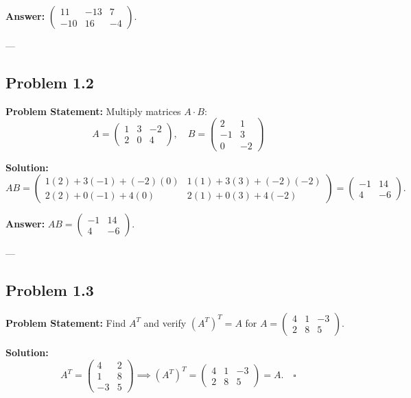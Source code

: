 \documentclass[11pt, a4paper]{article}
\begin{document}
\textbf{Answer:} $\begin{pmatrix} 11 & -13 & 7 \\ -10 & 16 & -4 \end{pmatrix}$.

---

\subsection*{Problem 1.2}
\textbf{Problem Statement:} Multiply matrices $A \cdot B$:
$$ A = \begin{pmatrix} 1 & 3 & -2 \\ 2 & 0 & 4 \end{pmatrix}, \quad B = \begin{pmatrix} 2 & 1 \\ -1 & 3 \\ 0 & -2 \end{pmatrix} $$

\textbf{Solution:}
$$ AB = \begin{pmatrix} 1(2)+3(-1)+(-2)(0) & 1(1)+3(3)+(-2)(-2) \\ 2(2)+0(-1)+4(0) & 2(1)+0(3)+4(-2) \end{pmatrix} = \begin{pmatrix} -1 & 14 \\ 4 & -6 \end{pmatrix}. $$

\textbf{Answer:} $AB = \begin{pmatrix} -1 & 14 \\ 4 & -6 \end{pmatrix}$.

---

\subsection*{Problem 1.3}
\textbf{Problem Statement:} Find $A^T$ and verify $(A^T)^T = A$ for $A = \begin{pmatrix} 4 & 1 & -3 \\ 2 & 8 & 5 \end{pmatrix}$.

\textbf{Solution:}
$$ A^T = \begin{pmatrix} 4 & 2 \\ 1 & 8 \\ -3 & 5 \end{pmatrix} \implies (A^T)^T = \begin{pmatrix} 4 & 1 & -3 \\ 2 & 8 & 5 \end{pmatrix} = A. \quad \square $$
\end{document}
